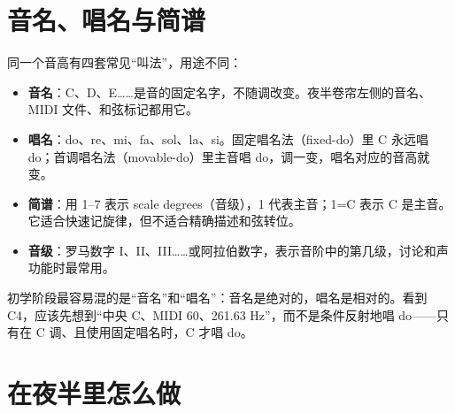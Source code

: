 \section{音名、唱名与简谱}

同一个音高有四套常见“叫法”，用途不同：

\begin{itemize}
  \item \textbf{音名}：C、D、E……是音的固定名字，不随调改变。夜半卷帘左侧的音名、MIDI 文件、和弦标记都用它。
  \item \textbf{唱名}：do、re、mi、fa、sol、la、si。固定唱名法（fixed-do）里 C 永远唱 do；首调唱名法（movable-do）里主音唱 do，调一变，唱名对应的音高就变。
  \item \textbf{简谱}：用 1–7 表示 scale degrees（音级），1 代表主音；1=C 表示 C 是主音。它适合快速记旋律，但不适合精确描述和弦转位。
  \item \textbf{音级}：罗马数字 I、II、III……或阿拉伯数字，表示音阶中的第几级，讨论和声功能时最常用。
\end{itemize}

初学阶段最容易混的是“音名”和“唱名”：音名是绝对的，唱名是相对的。看到 C4，应该先想到“中央 C、MIDI 60、261.63 Hz”，而不是条件反射地唱 do——只有在 C 调、且使用固定唱名时，C 才唱 do。

\section{在夜半里怎么做}


